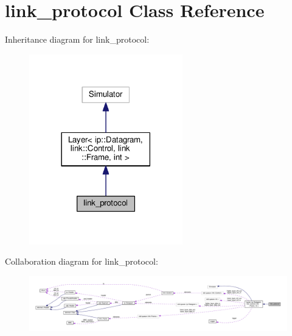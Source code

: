 \hypertarget{classlink__protocol}{}\section{link\+\_\+protocol Class Reference}
\label{classlink__protocol}


Inheritance diagram for link\+\_\+protocol\+:\nopagebreak
\begin{figure}[H]
\begin{center}
\leavevmode
\includegraphics[width=189pt]{classlink__protocol__inherit__graph}
\end{center}
\end{figure}


Collaboration diagram for link\+\_\+protocol\+:
\nopagebreak
\begin{figure}[H]
\begin{center}
\leavevmode
\includegraphics[width=350pt]{classlink__protocol__coll__graph}
\end{center}
\end{figure}
